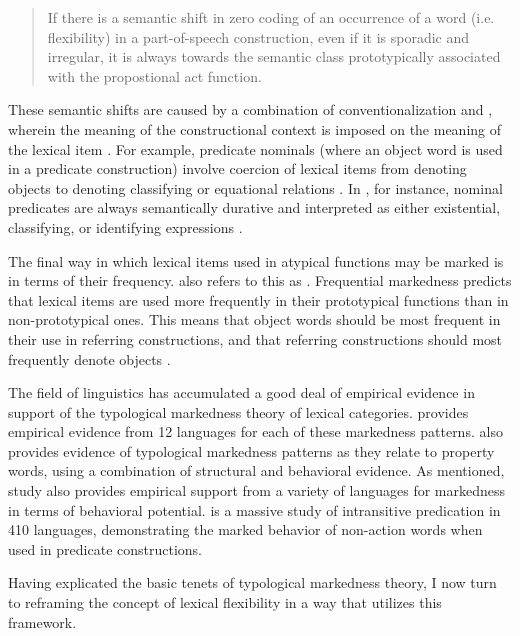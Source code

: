 \blockquote[{\cite[73]{Croft2001b}}]{If there is a semantic shift in zero coding of an occurrence of a word (i.e. flexibility) in a part-of-speech construction, even if it is sporadic and irregular, it is always towards the semantic class prototypically associated with the propostional act function.}

These semantic shifts are caused by a combination of conventionalization and , wherein the meaning of the constructional context is imposed on the meaning of the lexical item \parencites{Pustejovsky1991}[69, 108]{Croft1991}[252]{PantherThornburg2007}{AudringBooij2016}. For example, predicate nominals (where an object word is used in a predicate construction) involve coercion of lexical items from denoting objects to denoting classifying or equational relations \parencite[69]{Croft1991}. In , for instance, nominal predicates are always semantically durative and interpreted as either existential, classifying, or identifying expressions \parencite[47]{Nakayama2001}.

The final way in which lexical items used in atypical functions may be marked is in terms of their frequency. \textcite[59, 87]{Croft1991} also refers to this as . Frequential markedness predicts that lexical items are used more frequently in their prototypical functions than in non-prototypical ones. This means that object words should be most frequent in their use in referring constructions, and that referring constructions should most frequently denote objects \parencite[87]{Croft1991}.

The field of linguistics has accumulated a good deal of empirical evidence in support of the typological markedness theory of lexical categories. \textcite{Croft1991} provides empirical evidence from 12 languages for each of these markedness patterns. \textcite{Dixon1977} also provides evidence of typological markedness patterns as they relate to property words, using a combination of structural and behavioral evidence. As mentioned,  study also provides empirical support from a variety of languages for markedness in terms of behavioral potential. \textcite{Stassen1997} is a massive study of intransitive predication in 410 languages, demonstrating the marked behavior of non-action words when used in predicate constructions.

Having explicated the basic tenets of typological markedness theory, I now turn to reframing the concept of lexical flexibility in a way that utilizes this framework.

